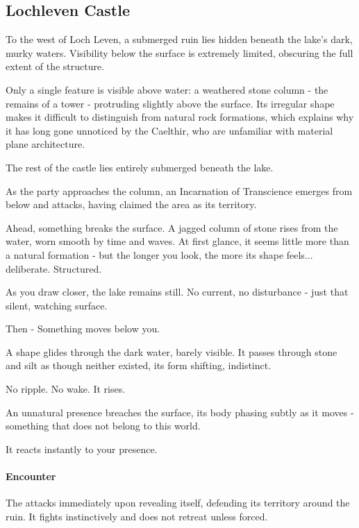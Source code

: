 \subsection*{Lochleven Castle}\label{subsec:LochlevenCastle}
{\entryfont To the west of Loch Leven, a submerged ruin lies hidden beneath the lake's dark, murky waters. Visibility below the surface is extremely limited, obscuring the full extent of the structure.

Only a single feature is visible above water: a weathered stone column - the remains of a tower - protruding slightly above the surface. Its irregular shape makes it difficult to distinguish from natural rock formations, which explains why it has long gone unnoticed by the Caelthir, who are unfamiliar with material plane architecture.

The rest of the castle lies entirely submerged beneath the lake.

As the party approaches the column, an Incarnation of Transcience emerges from below and attacks, having claimed the area as its territory.}
\begin{DndReadAloud}
	Ahead, something breaks the surface. A jagged column of stone rises from the water, worn smooth by time and waves. At first glance, it seems little more than a natural formation - but the longer you look, the more its shape feels... deliberate. Structured.

	As you draw closer, the lake remains still. No current, no disturbance  - just that silent, watching surface.

	Then - Something moves below you.

	A shape glides through the dark water, barely visible. It passes through stone and silt as though neither existed, its form shifting, indistinct.

	No ripple. No wake. It rises.

	An unnatural presence breaches the surface, its body phasing subtly as it moves - something that does not belong to this world.

	It reacts instantly to your presence.
\end{DndReadAloud}
{\paragraph*{Encounter}\entryfont The \hyperref[monster:IncarnationOfTranscience]{} attacks immediately upon revealing itself, defending its territory around the ruin. It fights instinctively and does not retreat unless forced.}
